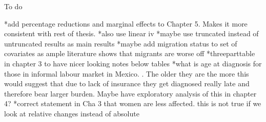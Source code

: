 To do

*add percentage reductions and marginal effects to Chapter 5. Makes it more consistent with rest of thesis.
*also use linear iv
*maybe use truncated instead of untruncated results as main results
*maybe add migration status to set of covariates as ample literature shows that migrants are worse off
*threeparttable in chapter 3 to have nicer looking notes below tables
*what is age at diagnosis for those in informal labour market in Mexico. . The older they are the more this would suggest that due to lack of insurance they get diagnosed really late and therefore bear larger burden. Maybe have exploratory analysis of this in chapter 4?
*correct statement in Cha 3 that women are less affected. this is not true if we look at relative changes instead of absolute